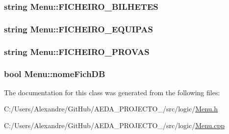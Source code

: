 \subsubsection[{F\+I\+C\+H\+E\+I\+R\+O\+\_\+\+B\+I\+L\+H\+E\+T\+E\+S}]{\setlength{\rightskip}{0pt plus 5cm}string Menu\+::\+F\+I\+C\+H\+E\+I\+R\+O\+\_\+\+B\+I\+L\+H\+E\+T\+E\+S\hspace{0.3cm}{\ttfamily [private]}}\label{class_menu_aa976bc24d00fe46961f952d5f50018bb}
\hypertarget{class_menu_ae54280f85716f145088ac12362643990}{}
\subsubsection[{F\+I\+C\+H\+E\+I\+R\+O\+\_\+\+E\+Q\+U\+I\+P\+A\+S}]{\setlength{\rightskip}{0pt plus 5cm}string Menu\+::\+F\+I\+C\+H\+E\+I\+R\+O\+\_\+\+E\+Q\+U\+I\+P\+A\+S\hspace{0.3cm}{\ttfamily [private]}}\label{class_menu_ae54280f85716f145088ac12362643990}
\hypertarget{class_menu_a01ed844b35f6f85bd5e71457309cee88}{}
\subsubsection[{F\+I\+C\+H\+E\+I\+R\+O\+\_\+\+P\+R\+O\+V\+A\+S}]{\setlength{\rightskip}{0pt plus 5cm}string Menu\+::\+F\+I\+C\+H\+E\+I\+R\+O\+\_\+\+P\+R\+O\+V\+A\+S\hspace{0.3cm}{\ttfamily [private]}}\label{class_menu_a01ed844b35f6f85bd5e71457309cee88}
\hypertarget{class_menu_a5af55687e99fc888917344837cdadbd1}{}
\subsubsection[{nome\+Fich\+D\+B}]{\setlength{\rightskip}{0pt plus 5cm}bool Menu\+::nome\+Fich\+D\+B\hspace{0.3cm}{\ttfamily [private]}}\label{class_menu_a5af55687e99fc888917344837cdadbd1}


The documentation for this class was generated from the following files\+:\begin{DoxyCompactItemize}
\item 
C\+:/\+Users/\+Alexandre/\+Git\+Hub/\+A\+E\+D\+A\+\_\+\+P\+R\+O\+J\+E\+C\+T\+O\+\_/src/logic/\hyperlink{_menu_8h}{Menu.\+h}\item 
C\+:/\+Users/\+Alexandre/\+Git\+Hub/\+A\+E\+D\+A\+\_\+\+P\+R\+O\+J\+E\+C\+T\+O\+\_/src/logic/\hyperlink{_menu_8cpp}{Menu.\+cpp}\end{DoxyCompactItemize}
